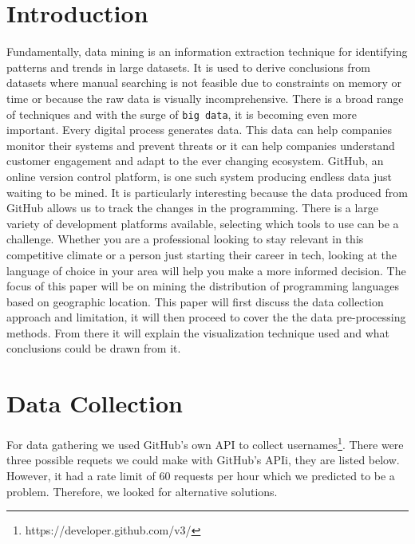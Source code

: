\documentclass[11pt]{article}
\begin{document}
\section{Introduction}
Fundamentally, data mining is an information extraction technique for identifying patterns and trends in large datasets. It is used to derive conclusions from datasets where manual searching is not feasible due to constraints on memory or time or because the raw data is visually incomprehensive. There is a broad range of techniques and with the surge of \texttt{big data}, it is becoming even more important. Every digital process generates data. This data can help companies monitor their systems and prevent threats or it can help companies understand customer engagement and adapt to the ever changing ecosystem. GitHub, an online version control platform, is one such system producing endless data just waiting to be mined. It is particularly interesting because the data produced from GitHub allows us to track the changes in the programming. There is a large variety of development platforms available, selecting which tools to use can be a challenge. Whether you are a professional looking to stay relevant in this competitive climate or a person just starting their career in tech, looking at the language of choice in your area will help you make a more informed decision. The focus of this paper will be on mining the distribution of programming languages based on geographic location. This paper will first discuss the data collection approach and limitation, it will then proceed to cover the the data pre-processing methods. From there it will explain the visualization technique used and what conclusions could be drawn from it.

\section{Data Collection}
For data gathering we used GitHub's own API to collect usernames\footnote{https://developer.github.com/v3/}. There were three possible requets we could make with GitHub's APIi, they are listed below. However, it had a rate limit of 60 requests per hour which we predicted to be a problem. Therefore, we looked for alternative solutions. 
\end{document}
